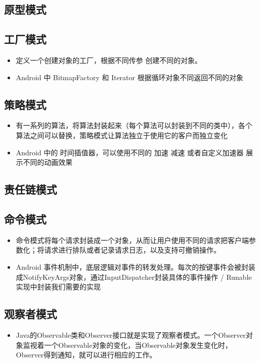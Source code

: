 \documentclass[9pt, b5paper]{article}
\begin{document}
\subsection{原型模式}
\label{sec-15-3}
\subsection{工厂模式}
\label{sec-15-4}
\begin{itemize}
\item 定义一个创建对象的工厂，根据不同传参 创建不同的对象。
\item Android 中 BitmapFactory 和 Iterator 根据循环对象不同返回不同的对象
\end{itemize}
\subsection{策略模式}
\label{sec-15-5}
\begin{itemize}
\item 有一系列的算法，将算法封装起来（每个算法可以封装到不同的类中），各个算法之间可以替换，策略模式让算法独立于使用它的客户而独立变化
\item Android 中的 时间插值器，可以使用不同的 加速 减速 或者自定义加速器 展示不同的动画效果
\end{itemize}
\subsection{责任链模式}
\label{sec-15-6}
\subsection{命令模式}
\label{sec-15-7}
\begin{itemize}
\item 命令模式将每个请求封装成一个对象，从而让用户使用不同的请求把客户端参数化；将请求进行排队或者记录请求日志，以及支持可撤销操作。
\item Android 事件机制中，底层逻辑对事件的转发处理。每次的按键事件会被封装成NotifyKeyArgs对象，通过InputDispatcher封装具体的事件操作 / Runable实现中封装我们需要的实现
\end{itemize}
\subsection{观察者模式}
\label{sec-15-8}
\begin{itemize}
\item Java的Observable类和Observer接口就是实现了观察者模式。一个Observer对象监视着一个Observable对象的变化，当Observable对象发生变化时，Observer得到通知，就可以进行相应的工作。
\end{itemize}
\end{document}
